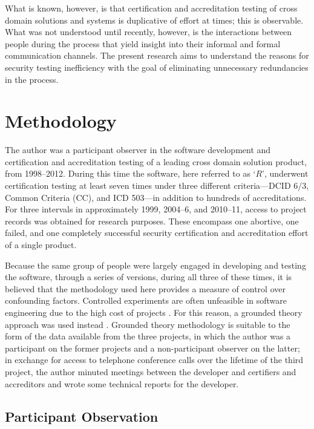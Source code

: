 \documentclass[10pt,letterpaper,conference]{IEEEtran}
\begin{document}
What is known, however, is that certification and accreditation testing of cross domain solutions
and systems is duplicative of effort at times; this is observable.  What was not understood until
recently, however, is the interactions between people during the process that yield insight into
their informal and formal communication channels.  The present research aims to understand the
reasons for security testing inefficiency with the goal of eliminating unnecessary redundancies in
the process.

\section{Methodology}\label{section:methodology}

The author was a participant observer in the software development and certification and
accreditation testing of a leading cross domain solution product, from 1998--2012.  During this
time the software, here referred to as `$R$', underwent certification testing at least seven
times under three different
criteria---DCID 6/3, Common Criteria (CC), and ICD 503---in addition to hundreds of accreditations.
For three intervals in approximately 1999, 2004--6, and 2010--11, access to project records was
obtained for
research purposes.  These encompass one abortive, one failed, and one completely successful security
certification and accreditation effort of a single product.

Because the same group of people were largely engaged in developing and testing the software,
through a series of versions, during all three of these times, it is believed that the
methodology used here provides a measure of control over confounding factors.  Controlled
experiments are often unfeasible in software engineering due to the high cost of projects
\cite{McCue1978,Rost2011}.  For this reason, a grounded theory approach was used instead
\cite{Glaser1967}.
Grounded theory methodology is suitable to the form of the data available from the three projects,
in which the author was a participant on the former projects and a non-participant observer on the
latter; in exchange for access to telephone conference calls over the lifetime of the third project,
the author minuted meetings between the developer and certifiers and accreditors and wrote some
technical reports for the developer.

\subsection{Participant Observation}
\end{document}
